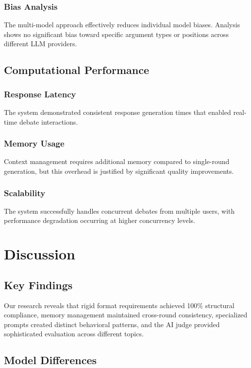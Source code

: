 \documentclass{article}
\begin{document}
\subsubsection{Bias Analysis}
The multi-model approach effectively reduces individual model biases. Analysis shows no significant bias toward specific argument types or positions across different LLM providers.

\subsection{Computational Performance}

\subsubsection{Response Latency}
The system demonstrated consistent response generation times that enabled real-time debate interactions.

\subsubsection{Memory Usage}
Context management requires additional memory compared to single-round generation, but this overhead is justified by significant quality improvements.

\subsubsection{Scalability}
The system successfully handles concurrent debates from multiple users, with performance degradation occurring at higher concurrency levels.

\section{Discussion}

\subsection{Key Findings}

Our research reveals that rigid format requirements achieved 100\% structural compliance, memory management maintained cross-round consistency, specialized prompts created distinct behavioral patterns, and the AI judge provided sophisticated evaluation across different topics.

\subsection{Model Differences}
\end{document}
